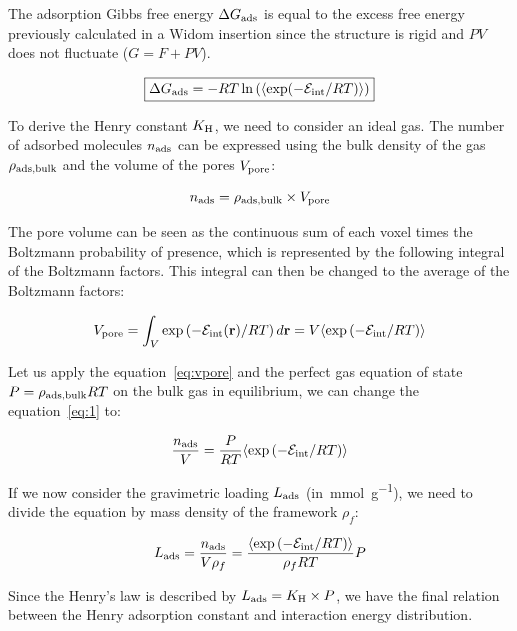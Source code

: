 \documentclass[main.tex]{subfiles}
\begin{document}
The adsorption Gibbs free energy $\Delta G_{\text{ads}}$ is equal to the excess free energy previously calculated in a Widom insertion since the structure is rigid and $PV$ does not fluctuate ($G = F + PV$). 

\begin{equation}\label{eq:ads_gibbs}
  \boxed{
  \Delta G_{\text{ads}} = -RT \ln\left(\langle \exp(-\mathcal{E}_{\text{int}}/RT) \rangle\right)
  }
\end{equation}

To derive the Henry constant $K_{\text{H}}$, we need to consider an ideal gas. The number of adsorbed molecules $n_{\text{ads}}$ can be expressed using the bulk density of the gas $\rho_{\text{ads,bulk}}$ and the volume of the pores $V_{\text{pore}}$:

\begin{equation}\label{eq:1}
    n_{\text{ads}} = \rho_{\text{ads,bulk}} \times V_{\text{pore}}  
\end{equation}

The pore volume can be seen as the continuous sum of each voxel times the Boltzmann probability of presence, which is represented by the following integral of the Boltzmann factors. This integral can then be changed to the average of the Boltzmann factors:

\begin{equation}\label{eq:vpore}
    V_{\text{pore}} = \int_V \exp\left(- \mathcal{E}_{\text{int}}(\textbf{r})/RT\right) d\textbf{r} = V \langle \exp\left(-\mathcal{E}_{\text{int}}/RT\right) \rangle
\end{equation}

Let us apply the equation~\ref{eq:vpore} and the perfect gas equation of state $P = \rho_{\text{ads,bulk}}RT$ on the bulk gas in equilibrium, we can change the equation~\ref{eq:1} to:

\begin{equation}
    \dfrac{n_{\text{ads}}}{V} = \dfrac{P}{RT} \langle \exp\left(-\mathcal{E}_{\text{int}}/RT\right) \rangle
\end{equation}

If we now consider the gravimetric loading $L_{\text{ads}}$ (in~\si{\milli\mole\per\gram}), we need to divide the equation by mass density of the framework $\rho_f$:

\begin{equation}
  L_{\text{ads}} = \dfrac{n_{\text{ads}}}{V\rho_f} = \dfrac{\langle \exp\left(-\mathcal{E}_{\text{int}}/RT\right) \rangle}{\rho_f RT} P
\end{equation}

Since the Henry's law is described by $L_{\text{ads}}=K_{\text{H}} \times P$, we have the final relation between the Henry adsorption constant and interaction energy distribution.
\end{document}
